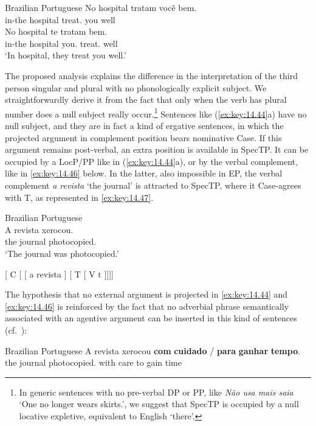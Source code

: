 \documentclass[output=paper]{langsci/langscibook}
\begin{document}
\ea\label{ex:key:14.45}Brazilian Portuguese
    \ea
	\gll    No hospital tratam você bem.\\
            in-the hospital treat.\Tpl{} you well\\
    \ex
    \gll    No hospital te tratam bem.\\
            in-the hospital you.\Acc{} treat.\Tpl{} well\\
    \glt    ‘In hospital, they treat you well.’
    \z
\z

The proposed analysis explains the difference in the interpretation of the
third person singular and plural with no phonologically explicit subject. We
straightforwardly derive it from the fact that only when the verb has plural
number does a null subject really occur.\footnote{In generic
    sentences with no pre-verbal DP or PP, like \emph{Não usa mais saia} ‘One
no longer wears skirts.’, we suggest that SpecTP is occupied by a null locative
expletive, equivalent to English ‘there’.} Sentences like
(\eqref{ex:key:14.44}a) have no null subject, and they are in fact a kind of
ergative sentences, in which the projected argument in complement position
bears nominative Case. If this argument remains
post-verbal, an extra position is available in SpecTP. It can be occupied by a
LocP/PP like in (\eqref{ex:key:14.44}a), or by the verbal complement, like in
\eqref{ex:key:14.46} below. In the latter, also impossible in EP, the verbal
complement \emph{a revista} ‘the journal’ is attracted to SpecTP, where it
Case-agrees with T, as represented in \eqref{ex:key:14.47}.

\ea\label{ex:key:14.46}Brazilian Portuguese\\
    \gll    A revista xerocou.\\
            the journal photocopied.\Tsg{}\\
    \glt    ‘The journal was photocopied.’
\z

\ea\label{ex:key:14.47}
    {}[ C [ [ a revista ] [ T  [ V t ]]]]
\z

The hypothesis that no external argument is projected in \eqref{ex:key:14.44} and
\eqref{ex:key:14.46} is reinforced by the fact that no adverbial phrase semantically
associated with an agentive argument can be inserted in this kind of sentences
(cf.\ \citealt{Galves2000}):

\ea%
    \label{ex:key:14.48}Brazilian Portuguese
    \gll    \llap{\#}A revista xerocou \textbf{com} \textbf{cuidado} / \textbf{para} \textbf{ganhar} \textbf{tempo}.\\
            the journal photocopied.\Tsg{} with care {} to gain time\\
\z
\end{document}

